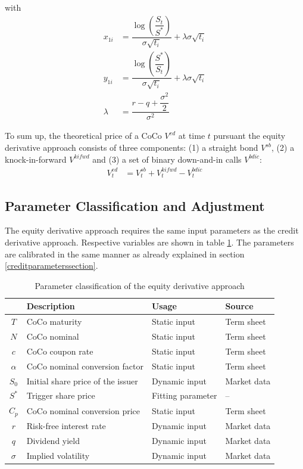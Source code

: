 with 
\begin{align*}
x_{1i} &= \dfrac{\log \left( \dfrac{S_t}{S^*} \right)}{\sigma \sqrt{t_i}} + \lambda \sigma \sqrt{t_i}\\
y_{1i} &= \dfrac{\log \left( \dfrac{S^*}{S_t} \right)}{\sigma \sqrt{t_i}} + \lambda \sigma \sqrt{t_i}\\
\lambda &= \dfrac{r-q+\dfrac{\sigma^2}{2}}{\sigma^2}
\end{align*}

To sum up, the theoretical price of a CoCo $V^{ed}$ at time $t$ pursuant the equity derivative approach consists of three components: (1) a straight bond $V^{sb}$, (2) a knock-in-forward $V^{kifwd}$ and (3) a set of binary down-and-in calls $V^{bdic}$:
\begin{align}
V^{ed}_t &= V^{sb}_t + V_t^{kifwd} - V_{t}^{bdic}
\end{align}

\subsection{Parameter Classification and Adjustment}

The equity derivative approach requires the same input parameters as the credit derivative approach. Respective variables are shown in table \ref{equityparameters}. The parameters are calibrated in the same manner as already explained in section \ref{creditparameterssection}.

\begin{table}[H]
	\setlength{\extrarowheight}{2.5pt}
	\centering
	\begin{tabular}{clll}
		\toprule
			 & \textbf{Description} & \textbf{Usage} & \textbf{Source} \\ 
		\midrule
			$T$ & CoCo maturity & Static input & Term sheet \\
			$N$ & CoCo nominal & Static input & Term sheet \\			
			$c$ & CoCo coupon rate & Static input & Term sheet \\
			$\alpha$ & CoCo nominal conversion factor & Static input & Term sheet \\
			$S_0$ & Initial share price of the issuer & Dynamic input & Market data \\
			$S^*$ & Trigger share price & Fitting parameter & -- \\
			$C_p$ & CoCo nominal conversion price & Static input & Term sheet \\
			$r$ & Risk-free interest rate & Dynamic input & Market data \\
			$q$ & Dividend yield & Dynamic input & Market data\\
			$\sigma$& Implied volatility & Dynamic input & Market data \\
		\bottomrule
	\end{tabular}
	\caption[Parameter classification of the equity derivative approach]{Parameter classification of the equity derivative approach \citep{wilkens2014contingent}}
	\label{equityparameters}
\end{table}

